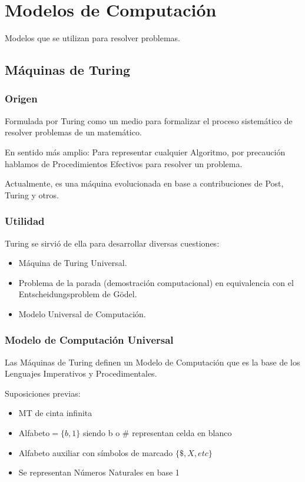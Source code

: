 \chapter{Modelos de Computación}\label{ch:modelos-de-computación}
Modelos que se utilizan para resolver problemas.
\section{Máquinas de Turing}
\subsection{Origen}
Formulada por Turing como un medio para formalizar el proceso sistemático de resolver problemas de un matemático.

En sentido más amplio: Para representar cualquier Algoritmo, por precaución hablamos de Procedimientos Efectivos para resolver un problema.

Actualmente, es una máquina evolucionada en base a contribuciones de Post, Turing y otros.

\subsection{Utilidad}
Turing se sirvió de ella para desarrollar diversas cuestiones: 
\begin{itemize}
    \item Máquina de Turing Universal.
    \item Problema de la parada (demostración computacional) en equivalencia con el Entscheidungsproblem de Gödel.
    \item Modelo Universal de Computación.
\end{itemize}

\subsection{Modelo de Computación Universal}
Las Máquinas de Turing definen un Modelo de Computación que es la base de los Lenguajes Imperativos y Procedimentales.

Suposiciones previas:
\begin{itemize}
    \item MT de cinta infinita
    \item Alfabeto$=\{b,1\}$ siendo b o $\#$ representan celda en blanco
    \item Alfabeto auxiliar con símbolos de marcado $\{\$, X, etc\}$
    \item Se representan Números Naturales en base 1
\end{itemize}

